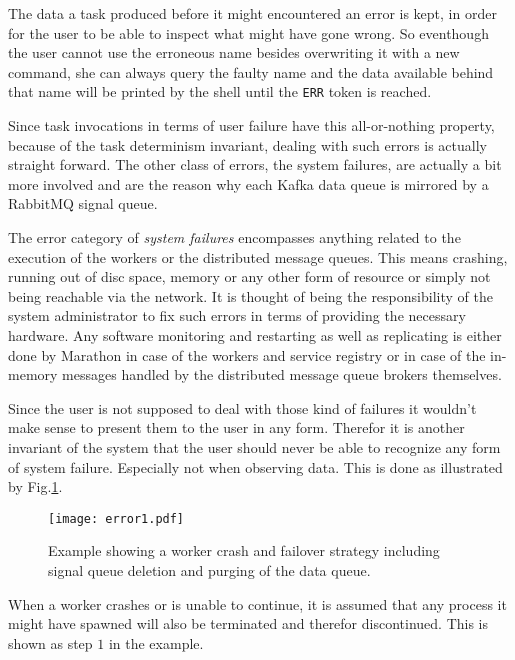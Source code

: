 The data a task produced before it might encountered an error is
kept, in order for the user to be able to inspect what might have
gone wrong. So eventhough the user cannot use the erroneous name
besides overwriting it with a new command, she can always
query the faulty name and the data available behind that name will
be printed by the shell until the \texttt{ERR} token is reached.

Since task invocations in terms of user failure have this
all-or-nothing property, because of the task determinism invariant,
dealing with such errors is actually straight forward.
The other class of errors, the system failures, are actually a bit more
involved and are the reason why each Kafka data queue is mirrored
by a RabbitMQ signal queue.
\newline

The error category of \textit{system failures} encompasses anything
related to the execution of the workers or the distributed message
queues. This means crashing, running out of disc space, memory or
any other form of resource or simply not being reachable via the network.
It is thought of being the responsibility of the system administrator
to fix such errors in terms of providing the necessary hardware.
Any software monitoring and restarting as well as replicating is either
done by Marathon in case of the workers and service registry or in
case of the in-memory messages handled by the distributed message
queue brokers themselves.

Since the user is not supposed to deal with those kind of failures
it wouldn't make sense to present them to the user in any form.
Therefor it is another invariant of the system that the user should
never be able to recognize any form of system failure. Especially
not when observing data.
This is done as illustrated by Fig.\ref{error1}.

\begin{figure}[h]
  \texttt{[image: error1.pdf]}
  \caption{Example showing a worker crash and failover strategy
           including signal queue deletion and purging of the
           data queue.}
  \label{error1}
\end{figure}

When a worker crashes or is unable to
continue, it is assumed that any process it might have spawned
will also be terminated and therefor discontinued. This is shown
as step $1$ in the example.


